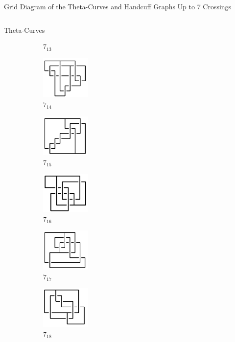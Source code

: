 \documentclass[final]{beamer}
\begin{document}
\begin{frame}[t]
\begin{alertblock}{Grid Diagram of the Theta-Curves and Handcuff Graphs Up to 7 Crossings}
\begin{columns}[t]
\begin{column}{0.6\textwidth}
\begin{alertblock}{Theta-Curves}
\begin{figure}
\begin{subfigure}{0.075\textwidth}
    \caption{$7_{13}$} 
    \end{subfigure}
    \begin{subfigure}{0.075\textwidth}
    \includegraphics[width=2.4cm]{../Midterm_Poster/grid_diagram/theta_7_14.png}
    \caption{$7_{14}$} 
    \end{subfigure}
    \begin{subfigure}{0.075\textwidth}
    \includegraphics[width=2.4cm]{../Midterm_Poster/grid_diagram/theta_7_15.png}
    \caption{$7_{15}$} 
    \end{subfigure}
    \begin{subfigure}{0.075\textwidth}
    \includegraphics[width=2.4cm]{../Midterm_Poster/grid_diagram/theta_7_16.png}
    \caption{$7_{16}$} 
    \end{subfigure}
    \begin{subfigure}{0.075\textwidth}
    \includegraphics[width=2.4cm]{../Midterm_Poster/grid_diagram/theta_7_17.png}
    \caption{$7_{17}$} 
    \end{subfigure}
    \begin{subfigure}{0.075\textwidth}
    \includegraphics[width=2.4cm]{../Midterm_Poster/grid_diagram/theta_7_18.png}
    \caption{$7_{18}$} 
    \end{subfigure}
    \begin{subfigure}{0.075\textwidth}

\end{subfigure}
\end{figure}
\end{alertblock}
\end{column}
\end{columns}
\end{alertblock}
\end{frame}
\end{document}
